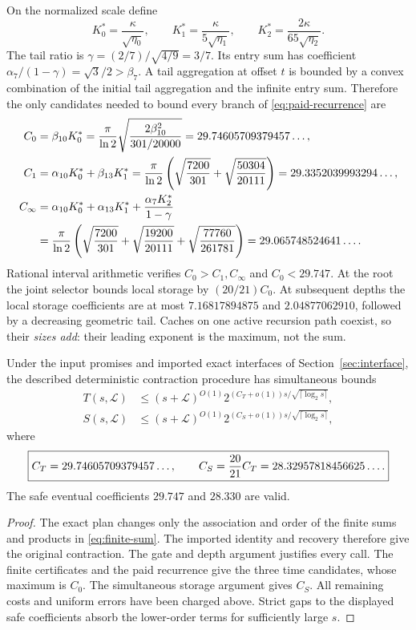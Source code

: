 On the normalized scale define
\[
 K_0^*=\frac\kappa{\sqrt{\eta_0}},\qquad
 K_1^*=\frac\kappa{5\sqrt{\eta_1}},\qquad
 K_2^*=\frac{2\kappa}{65\sqrt{\eta_2}}.
\]
The tail ratio is $\gamma=(2/7)/\sqrt{4/9}=3/7$. Its entry sum has
coefficient $\alpha_7/(1-\gamma)=\sqrt3/2>\beta_7$. A tail aggregation
at offset $t$ is bounded by a convex combination of the initial tail
aggregation and the infinite entry sum. Therefore the only candidates
needed to bound every branch of \eqref{eq:paid-recurrence} are
\begin{align}
 C_0&=\beta_{10}K_0^*
 =\frac\pi{\ln2}\sqrt{\frac{2\beta_{10}^2}{301/20000}}
 =29.74605709379457\ldots,\label{eq:C0}\\
 C_1&=\alpha_{10}K_0^*+\beta_{13}K_1^*
 =\frac\pi{\ln2}\left(\sqrt{\frac{7200}{301}}
                       +\sqrt{\frac{50304}{20111}}\right)
 =29.3352039993294\ldots,\label{eq:C1}\\
 C_\infty&=\alpha_{10}K_0^*+\alpha_{13}K_1^*
                 +\frac{\alpha_7K_2^*}{1-\gamma}\notag\\
 &=\frac\pi{\ln2}\left(\sqrt{\frac{7200}{301}}
        +\sqrt{\frac{19200}{20111}}
        +\sqrt{\frac{77760}{261781}}\right)
 =29.065748524641\ldots .\label{eq:Cinf}
\end{align}
Rational interval arithmetic verifies $C_0>C_1,C_\infty$ and
$C_0<29.747$. At the root the joint selector bounds local storage by
$(20/21)C_0$. At subsequent depths the local storage coefficients are at
most $7.16817894875$ and $2.04877062910$, followed by a decreasing
geometric tail. Caches on one active recursion path coexist, so their
\emph{sizes add}: their leading exponent is the maximum, not the sum.

\begin{theorem}\label{thm:global}
Under the input promises and imported exact interfaces of
Section~\ref{sec:interface}, the described deterministic contraction
procedure has simultaneous bounds
\begin{align*}
 T(s,\mathcal L)&\le(s+\mathcal L)^{O(1)}
    2^{(C_T+o(1))s/\sqrt{\lceil\log_2s\rceil}},\\
 S(s,\mathcal L)&\le(s+\mathcal L)^{O(1)}
    2^{(C_S+o(1))s/\sqrt{\lceil\log_2s\rceil}},
\end{align*}
where
\[
 \boxed{C_T=29.74605709379457\ldots,\qquad
 C_S=\frac{20}{21}C_T=28.32957818456625\ldots.}
\]
The safe eventual coefficients $29.747$ and $28.330$ are valid.
\end{theorem}
\begin{proof}
The exact plan changes only the association and order of the finite sums
and products in \eqref{eq:finite-sum}. The imported identity and recovery
therefore give the original contraction. The gate and depth argument
justifies every call. The finite certificates and the paid recurrence give
the three time candidates, whose maximum is $C_0$. The simultaneous
storage argument gives $C_S$. All remaining costs and uniform errors have
been charged above. Strict gaps to the displayed safe coefficients absorb
the lower-order terms for sufficiently large $s$.
\end{proof}
